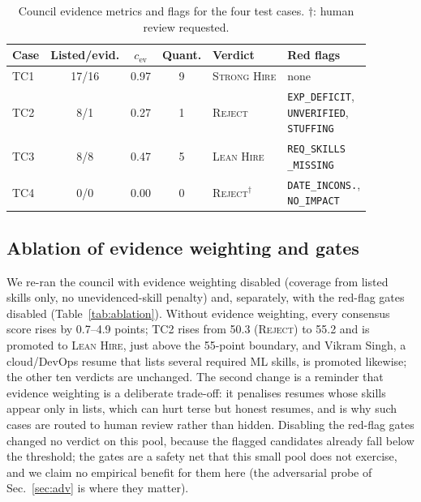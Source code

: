 \documentclass[conference]{IEEEtran}
\newcommand{\verd}[1]{\textsc{#1}}
\newcommand{\tflag}[1]{\texttt{\scriptsize #1}}
\newcommand{\Sstrong}{\verd{Strong Hire}}
\newcommand{\Slean}{\verd{Lean Hire}}
\newcommand{\Sreject}{\verd{Reject}}
\begin{document}
\begin{table}[t]
\caption{Council evidence metrics and flags for the four test cases. $\dagger$: human review requested.}
\label{tab:evidence}
\centering
\footnotesize
\renewcommand{\arraystretch}{1.15}
\begin{adjustbox}{max width=\columnwidth}
\begin{tabular}{@{}lcccll@{}}
\toprule
Case & Listed/evid. & $c_{\mathrm{ev}}$ & Quant. & Verdict & Red flags \\
\midrule
TC1 & 17/16 & 0.97 & 9 & \Sstrong & none \\
TC2 & 8/1   & 0.27 & 1 & \Sreject & \shortstack[l]{\tflag{EXP\_DEFICIT},\\\tflag{UNVERIFIED},\\\tflag{STUFFING}} \\
TC3 & 8/8   & 0.47 & 5 & \Slean   & \shortstack[l]{\tflag{REQ\_SKILLS}\\\tflag{\_MISSING}} \\
TC4 & 0/0   & 0.00 & 0 & \Sreject$^{\dagger}$ & \shortstack[l]{\tflag{DATE\_INCONS.},\\\tflag{NO\_IMPACT}} \\
\bottomrule
\end{tabular}
\end{adjustbox}
\end{table}

\subsection{Ablation of evidence weighting and gates}
We re-ran the council with evidence weighting disabled (coverage from listed skills only, no unevidenced-skill penalty) and, separately, with the red-flag gates disabled (Table~\ref{tab:ablation}). Without evidence weighting, every consensus score rises by 0.7--4.9 points; TC2 rises from 50.3 (\Sreject) to 55.2 and is promoted to \Slean{}, just above the 55-point boundary, and Vikram Singh, a cloud/DevOps resume that lists several required ML skills, is promoted likewise; the other ten verdicts are unchanged. The second change is a reminder that evidence weighting is a deliberate trade-off: it penalises resumes whose skills appear only in lists, which can hurt terse but honest resumes, and is why such cases are routed to human review rather than hidden. Disabling the red-flag gates changed no verdict on this pool, because the flagged candidates already fall below the threshold; the gates are a safety net that this small pool does not exercise, and we claim no empirical benefit for them here (the adversarial probe of Sec.~\ref{sec:adv} is where they matter).
\end{document}

